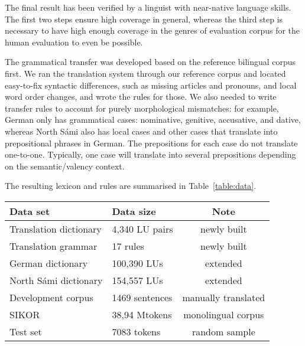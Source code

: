 \documentclass{flammie}
\begin{document}
The final result has been verified by a linguist with near-native language
skills. The first two steps ensure high coverage in general, whereas the third
step is necessary to have high enough coverage in the genres of evaluation
corpus for the human evaluation to even be possible.



The grammatical transfer was developed based on the reference bilingual corpus
first.  We ran the translation system through our reference corpus and located
easy-to-fix syntactic differences, such as missing articles and pronouns, and
local word order changes, and wrote the rules for those.  We also needed to
write transfer rules to account for purely morphological mismatches: for
example, German only has grammatical cases: nominative, genitive, accusative,
and dative, whereas North Sámi also has local cases and other cases that
translate into prepositional phrases in German. The prepositions for each case
do not translate one-to-one. Typically, one case will translate into several
prepositions depending on the semantic/valency context.

The resulting lexicon and rules are summarised in Table~\ref{table:data}.

\begin{table*}[htb]
    \centering
    \begin{tabular}{l|l|c}
        \bf Data set & \bf Data size & \bf Note\\
        \hline
        Translation dictionary & 4,340 LU pairs & newly built \\
        Translation grammar & 17 rules & newly built \\
        \hline
        German dictionary & 100,390 LUs & extended \\
        North Sámi dictionary & 154,557 LUs &  extended \\
        \hline
        Development corpus & 1469 sentences & manually translated \\
        SIKOR & 38,94 Mtokens & monolingual corpus \\
        Test set & 7083 tokens & random sample\\
    \end{tabular}
    \caption{$LU$ is a lexical unit e.g. an entry in the dictionaries, $token$
    is a token in a running text e.g. word-form or punctuation, $Mtokens$ is
    millions of tokens, and $sentences$ in the text are based on our sentence
    boundary finding algorithm.  \label{table:data}}
\end{table*}
\end{document}
